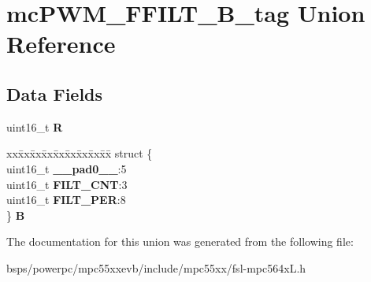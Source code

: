 \hypertarget{unionmcPWM__FFILT__16B__tag}{}\section{mc\+P\+W\+M\+\_\+\+F\+F\+I\+L\+T\+\_\+B\+\_\+tag Union Reference}
\label{unionmcPWM__FFILT__16B__tag}
\subsection*{Data Fields}
\begin{DoxyCompactItemize}
\item 
\mbox{\label{unionmcPWM__FFILT__16B__tag_adf2e5a3423803b51e8bbf2e7f6e72c6d}} 
uint16\+\_\+t {\bfseries R}
\item 
\mbox{\label{unionmcPWM__FFILT__16B__tag_afdaf61cfd0c9f450c1d726bdf4ca7d0e}} 
\begin{tabbing}
xx\=xx\=xx\=xx\=xx\=xx\=xx\=xx\=xx\=\kill
struct \{\\
\>uint16\_t {\bfseries \_\_pad0\_\_}:5\\
\>uint16\_t {\bfseries FILT\_CNT}:3\\
\>uint16\_t {\bfseries FILT\_PER}:8\\
\} {\bfseries B}\\

\end{tabbing}\end{DoxyCompactItemize}


The documentation for this union was generated from the following file\+:\begin{DoxyCompactItemize}
\item 
bsps/powerpc/mpc55xxevb/include/mpc55xx/fsl-\/mpc564x\+L.\+h\end{DoxyCompactItemize}
